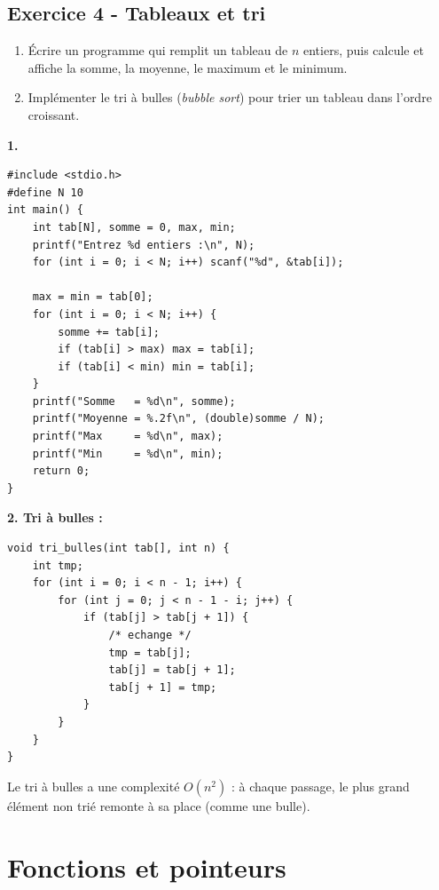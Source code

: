 \documentclass[12pt,a4paper]{article}
\begin{document}
\subsection*{Exercice 4 - Tableaux et tri \niveau{\moyen}}

\begin{boiteexercice}
\begin{enumerate}
  \item Écrire un programme qui remplit un tableau de $n$ entiers, puis calcule et affiche la somme, la moyenne, le maximum et le minimum.
  \item Implémenter le tri à bulles (\textit{bubble sort}) pour trier un tableau dans l'ordre croissant.
\end{enumerate}
\end{boiteexercice}

\begin{boitecorrige}
\textbf{1.}
\begin{lstlisting}
#include <stdio.h>
#define N 10
int main() {
    int tab[N], somme = 0, max, min;
    printf("Entrez %d entiers :\n", N);
    for (int i = 0; i < N; i++) scanf("%d", &tab[i]);

    max = min = tab[0];
    for (int i = 0; i < N; i++) {
        somme += tab[i];
        if (tab[i] > max) max = tab[i];
        if (tab[i] < min) min = tab[i];
    }
    printf("Somme   = %d\n", somme);
    printf("Moyenne = %.2f\n", (double)somme / N);
    printf("Max     = %d\n", max);
    printf("Min     = %d\n", min);
    return 0;
}
\end{lstlisting}

\textbf{2. Tri à bulles :}
\begin{lstlisting}
void tri_bulles(int tab[], int n) {
    int tmp;
    for (int i = 0; i < n - 1; i++) {
        for (int j = 0; j < n - 1 - i; j++) {
            if (tab[j] > tab[j + 1]) {
                /* echange */
                tmp = tab[j];
                tab[j] = tab[j + 1];
                tab[j + 1] = tmp;
            }
        }
    }
}
\end{lstlisting}

Le tri à bulles a une complexité $O(n^2)$ : à chaque passage, le plus grand élément non trié remonte à sa place (comme une bulle).
\end{boitecorrige}

\section{Fonctions et pointeurs}
\end{document}
